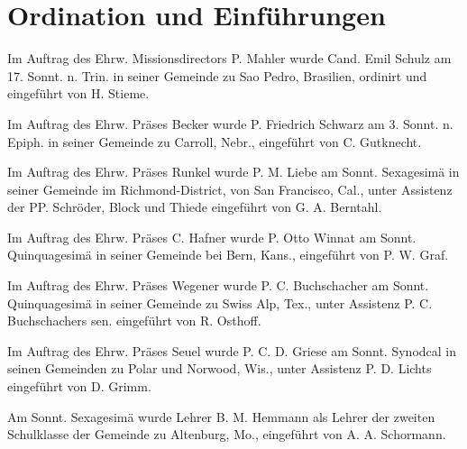 \chapter{Ordination und Einführungen}

Im Auftrag des Ehrw. Missionsdirectors P. Mahler wurde Cand. Emil Schulz am 17. Sonnt. n. Trin. in seiner Gemeinde zu Sao Pedro, Brasilien, ordinirt und eingeführt von H. Stieme.

Im Auftrag des Ehrw. Präses Becker wurde P. Friedrich Schwarz am 3. Sonnt. n. Epiph. in seiner Gemeinde zu Carroll, Nebr., eingeführt von C. Gutknecht.


Im Auftrag des Ehrw. Präses Runkel wurde P. M. Liebe am Sonnt. Sexagesimä in seiner Gemeinde im Richmond-District, von San Francisco, Cal., unter Assistenz der PP. Schröder, Block und Thiede eingeführt von G. A. Berntahl.

Im Auftrag des Ehrw. Präses C. Hafner wurde P. Otto Winnat am Sonnt. Quinquagesimä in seiner Gemeinde bei Bern, Kans., eingeführt von P. W. Graf.

Im Auftrag des Ehrw. Präses Wegener wurde P. C. Buchschacher am Sonnt. Quinquagesimä in seiner Gemeinde zu Swiss Alp, Tex., unter Assistenz P. C. Buchschachers sen. eingeführt von R. Osthoff.

Im Auftrag des Ehrw. Präses Seuel wurde P. C. D. Griese am Sonnt. Synodcal in seinen Gemeinden zu Polar und Norwood, Wis., unter Assistenz P. D. Lichts eingeführt von D. Grimm.

Am Sonnt. Sexagesimä wurde Lehrer B. M. Hemmann als Lehrer der zweiten Schulklasse der Gemeinde zu Altenburg, Mo., eingeführt von A. A. Schormann.
